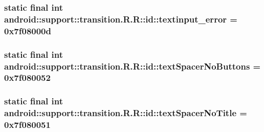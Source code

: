\hypertarget{classandroid_1_1support_1_1transition_1_1_r_1_1id_4fa041718ae5a7565ec0356ca9325b7c}{
\subsubsection[{textinput\_\-error}]{\setlength{\rightskip}{0pt plus 5cm}static final int android::support::transition.R.R::id::textinput\_\-error = 0x7f08000d}}
\label{classandroid_1_1support_1_1transition_1_1_r_1_1id_4fa041718ae5a7565ec0356ca9325b7c}


\hypertarget{classandroid_1_1support_1_1transition_1_1_r_1_1id_d6220f0e56cdc89154e0de93d1148d53}{
\subsubsection[{textSpacerNoButtons}]{\setlength{\rightskip}{0pt plus 5cm}static final int android::support::transition.R.R::id::textSpacerNoButtons = 0x7f080052}}
\label{classandroid_1_1support_1_1transition_1_1_r_1_1id_d6220f0e56cdc89154e0de93d1148d53}


\hypertarget{classandroid_1_1support_1_1transition_1_1_r_1_1id_bc13855eb7631f9ed5d6b93482ecaebe}{
\subsubsection[{textSpacerNoTitle}]{\setlength{\rightskip}{0pt plus 5cm}static final int android::support::transition.R.R::id::textSpacerNoTitle = 0x7f080051}}
\label{classandroid_1_1support_1_1transition_1_1_r_1_1id_bc13855eb7631f9ed5d6b93482ecaebe}


